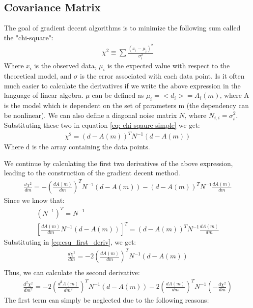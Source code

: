 \documentclass[12pt, TexShade, letterpaper]{report}
\begin{document}
\subsection{Covariance Matrix}
\label{chap:method,sub:cov_mat}
The goal of gradient decent algorithms is to minimize the following sum called the "chi-square":
\begin{gather}
    \chi^2 \equiv \sum \frac {(x_i - \mu_i)^2}{\sigma^2_{i}}
    \label{eq: chi-sqaure simple}
\end{gather}
Where $x_i$ is the observed data, $\mu_i$ is the expected value with respect to the theoretical model, and $\sigma$ is the error associated with each data point. Is it often much easier to calculate the derivatives if we write the above expression in the language of linear algebra. $\mu$ can be defined as $\mu_i=<d_i>=A_i(m)$, where A is the model which is dependent on the set of parameters m (the dependency can be nonlinear). We can also define a diagonal noise matrix $N$, where $N_{i, i} = \sigma^2_{i}$. Substituting these two in equation \ref{eq: chi-sqaure simple} we get:
\begin{gather}
    \chi^2 = (d-A(m))^T N^{-1} (d-A(m))
    \label{eq:chi-square matrix}
\end{gather}
Where d is the array containing the data points.\par
We continue by calculating the first two derivatives of the above expression, leading to the construction of the gradient decent method.
\begin{gather}
        \frac{d \chi^2}{dm} = - (\frac{dA(m)}{dm})^T N^{-1} (d-A(m)) - (d-A(m))^T N^{-1} \frac{dA(m)}{dm} \label{eq:csq_first_deriv}
\end{gather}
Since we know that:
\begin{gather}
    (N^{-1})^T = N^{-1}\\
    [\frac{dA(m)}{dm} N^{-1} (d-A(m))]^T = (d-A(m))^T N^{-1} \frac{dA(m)}{dm}
\end{gather}
Substituting in \ref{eq:csq_first_deriv}, we get:
\begin{align}
    \frac{d \chi^2}{dm} = -2 (\frac{dA(m)}{dm})^T N^{-1} (d-A(m))\\
\end{align}
Thus, we can calculate the second derivative:
\begin{align}
    \frac{d^2 \chi^2}{dm^2} = -2 (\frac{d^2A(m)}{dm^2})^T N^{-1} (d - A(m)) -2 ( \frac{dA(m)}{dm}) ^T N^{-1} (-\frac{d\chi^2}{dm})
\end{align}
The first term can simply be neglected due to the following reasons:\par
\end{document}
